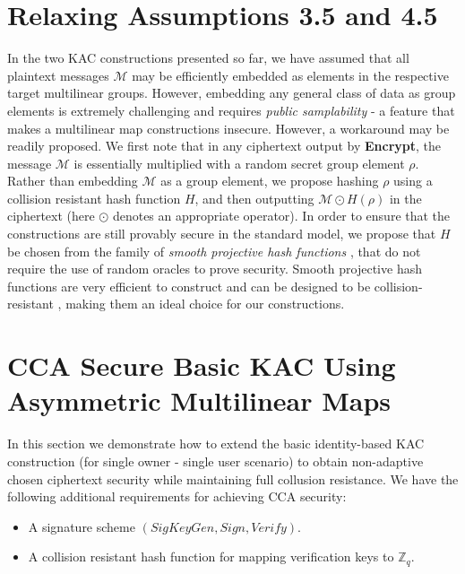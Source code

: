 \appendix

\section{Relaxing Assumptions 3.5 and 4.5}
\label{app_sec:relaxation}

In the two KAC constructions presented so far, we have assumed that all plaintext messages $\mathcal{M}$ may be efficiently embedded as elements in the respective target multilinear groups. However, embedding any general class of data as group elements is extremely challenging and requires \emph{public samplability} - a feature that makes a multilinear map constructions insecure. However, a workaround may be readily proposed. We first note that in any ciphertext output by \textbf{Encrypt}, the message $\mathcal{M}$ is essentially multiplied with a random secret group element $\rho$. Rather than embedding $\mathcal{M}$ as a group element, we propose hashing $\rho$ using a collision resistant hash function $H$, and then outputting $\mathcal{M}\odot H(\rho)$ in the ciphertext (here $\odot$ denotes an appropriate operator). In order to ensure that the constructions are still provably secure in the standard model, we propose that $H$ be chosen from the family of \emph{smooth projective hash functions} \cite{cramer2002universal}, that do not require the use of random oracles to prove security. Smooth projective hash functions are very efficient to construct and can be designed to be collision-resistant \cite{abdalla2009smooth}, making them an ideal choice for our constructions.

\section{CCA Secure Basic KAC Using Asymmetric Multilinear Maps}
\label{app_sec:CCA1}

In this section we demonstrate how to extend the basic identity-based KAC construction (for single owner - single user scenario) to obtain non-adaptive chosen ciphertext security while maintaining full collusion resistance. We have the following additional requirements for achieving CCA security:

\begin{itemize}
 \item A signature scheme $(SigKeyGen,Sign,Verify)$. 
 \item A collision resistant hash function for mapping verification keys to $\mathbb{Z}_q$. 
\end{itemize}

